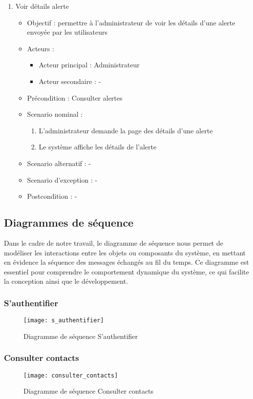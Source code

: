 \begin{enumerate}[label=\alph*.]
	\item Voir détails alerte
	\begin{itemize}
		\item Objectif : permettre à l’administrateur de voir les détails d’une alerte envoyée par les utilisateurs
		\item Acteurs :
		\begin{itemize}
			\item Acteur principal : Administrateur
			\item Acteur secondaire : -
		\end{itemize}
		\item Précondition : Consulter alertes
		\item Scenario nominal :
		\begin{enumerate}[label=\arabic*.]
			\item L’administrateur demande la page des détails d’une alerte
			\item Le système affiche les détails de l’alerte
		\end{enumerate}
		\item Scenario alternatif : -
		\item Scenario d’exception : -
		\item Postcondition : -
	\end{itemize}
\end{enumerate}

\subsection{Diagrammes de séquence}

Dans le cadre de notre travail, le diagramme de séquence nous permet de modéliser les interactions entre les objets ou composants du système, en mettant en évidence la séquence des messages échangés au fil du temps. Ce diagramme est essentiel pour comprendre le comportement dynamique du système, ce qui facilite la conception ainsi que le développement.

\subsubsection{S'authentifier}
\begin{figure}[H]
	\texttt{[image: s\_authentifier]}
	\caption{Diagramme de séquence S’authentifier}
\end{figure}

\subsubsection{Consulter contacts}
\begin{figure}[H]
	\texttt{[image: consulter\_contacts]}
	\caption{Diagramme de séquence Consulter contacts}
\end{figure}

